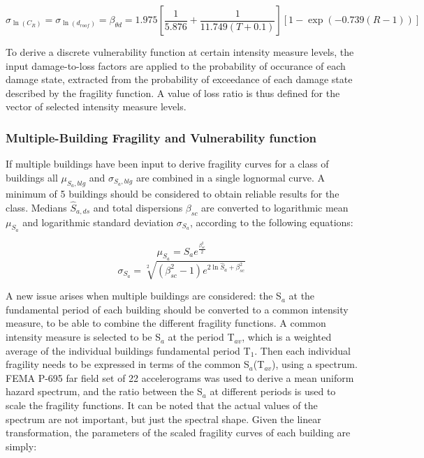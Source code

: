\begin{equation}
\sigma_{\ln(C_R)} = \sigma_{\ln(d_{roof})} = \beta_{\theta d} =  1.975 [\frac{1}{5.876} + \frac{1}{11.749 (T + 0.1)}] [1- \exp(-0.739 (R - 1))]
\end{equation}

To derive a discrete vulnerability function at certain intensity measure levels, the input damage-to-loss factors are applied to the probability of occurance of each damage state, extracted from the probability of exceedance of each damage state described by the fragility function. A value of loss ratio is thus defined for the vector of selected intensity measure levels.

\subsubsection{Multiple-Building Fragility and Vulnerability function}
\label{subsubsec:multiple-buildings}
If multiple buildings have been input to derive fragility curves for a class of buildings all $\mu_{S_a, blg}$ and $\sigma_{S_a, blg}$ are combined in a single lognormal curve. A minimum of 5 buildings should be considered to obtain reliable results for the class. Medians $\hat{S}_{a,ds}$ and total dispersions $\beta_{sc}$ are converted to logarithmic mean $\mu_{S_a}$ and logarithmic standard deviation $\sigma_{S_a}$, according to the following equations:

\begin{equation}
\mu_{S_a} = \hat{S}_a e^{\frac{\beta_{sc}^2}{2}}
\label{eq:median-to-mean}
\end{equation}
\begin{equation}
\sigma_{S_a} = \sqrt[2]{(\beta_{sc}^2-1) e^{2\ln{ \hat{S}_a}+\beta_{sc}^2}}
\label{eq:dispersion-to-standard}
\end{equation}

A new issue arises when multiple buildings are considered: the S$_a$ at the fundamental period of each building should be converted to a common intensity measure, to be able to combine the different fragility functions. A common intensity measure is selected to be S$_a$ at the period T$_{av}$, which is a weighted average of the individual buildings fundamental period T$_1$. Then each individual fragility needs to be expressed in terms of the common S$_a$(T$_{av}$), using a spectrum. FEMA P-695 far field set of 22 accelerograms was used to derive a mean uniform hazard spectrum, and the ratio between the S$_a$ at different periods is used to scale the fragility functions. It can be noted that the actual values of the spectrum are not important, but just the spectral shape. Given the linear transformation, the parameters of the scaled fragility curves of each building are simply:


